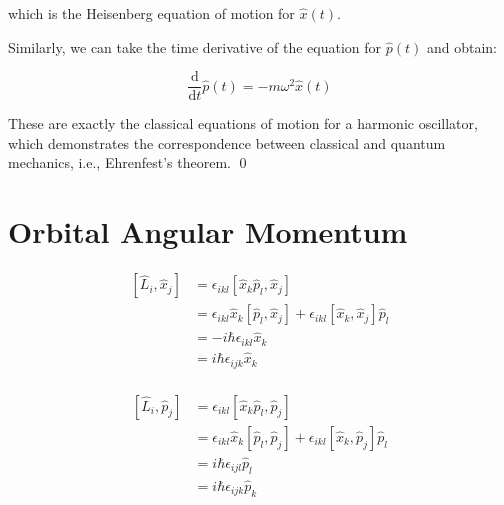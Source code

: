 \documentclass[12pt]{article}
\begin{document}
which is the Heisenberg equation of motion for $\hat{x}(t)$.

Similarly, we can take the time derivative of the equation for $\hat{p}(t)$ and obtain:

\begin{equation}
    \frac{\mathrm{d}}{\mathrm{d}t} \hat{p}(t) = -m\omega^{2} \hat{x}(t)
\end{equation}

These are exactly the classical equations of motion for a harmonic oscillator, which demonstrates the correspondence between classical and quantum mechanics, i.e., Ehrenfest's theorem.
\qed


\pagebreak
\section*{Orbital Angular Momentum}




\begin{equation}
\begin{split}
    [\hat{L}_{i}, \hat{x}_{j}] &= \epsilon_{ikl} [\hat{x}_{k} \hat{p}_{l}, \hat{x}_{j}] \\
    &= \epsilon_{ikl} \hat{x}_{k} [\hat{p}_{l}, \hat{x}_{j}] + \epsilon_{ikl} [\hat{x}_{k}, \hat{x}_{j}] \hat{p}_{l} \\
    &= -i\hbar \epsilon_{ikl} \hat{x}_{k} \\
    &= i\hbar \epsilon_{ijk} \hat{x}_{k} \\
\end{split}
\end{equation}

\begin{equation}
\begin{split}
    [\hat{L}_{i}, \hat{p}_{j}] &= \epsilon_{ikl} [\hat{x}_{k} \hat{p}_{l}, \hat{p}_{j}] \\
    &= \epsilon_{ikl} \hat{x}_{k} [\hat{p}_{l}, \hat{p}_{j}] + \epsilon_{ikl} [\hat{x}_{k}, \hat{p}_{j}] \hat{p}_{l} \\
    &= i\hbar \epsilon_{ijl} \hat{p}_{l} \\
    &= i\hbar \epsilon_{ijk} \hat{p}_{k} \\
\end{split}
\end{equation}

\end{document}

